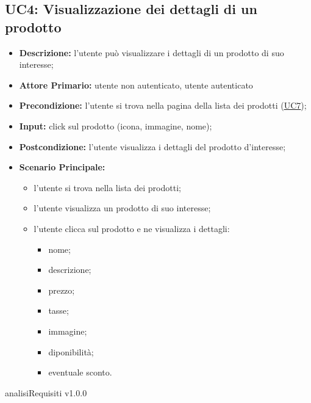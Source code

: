 \subsection{UC4: Visualizzazione dei dettagli di un prodotto }
\label{sec:UC4}
\begin{itemize}
    \item \textbf{Descrizione:} l'utente può visualizzare i dettagli di un prodotto di suo interesse;
    \item \textbf{Attore Primario:} utente non autenticato, utente autenticato
    \item \textbf{Precondizione:} l'utente si trova nella pagina della lista dei prodotti (\hyperref[sec:UC7]{\underline{UC7}});
    \item \textbf{Input:} click sul prodotto (icona, immagine, nome);
    \item \textbf{Postcondizione:} l'utente visualizza i dettagli del prodotto d'interesse;
    \item \textbf{Scenario Principale:}
          \begin{itemize}
              \item l'utente si trova nella lista dei prodotti;
              \item l'utente visualizza un prodotto di suo interesse;
              \item l'utente clicca sul prodotto e ne visualizza i dettagli:
                    \begin{itemize}
                        \item nome;
                        \item descrizione;
                        \item prezzo;
                        \item tasse;
                        \item immagine;
                        \item diponibilità;
                        \item eventuale sconto.
                    \end{itemize}
          \end{itemize}
\end{itemize}


analisiRequisiti v1.0.0
